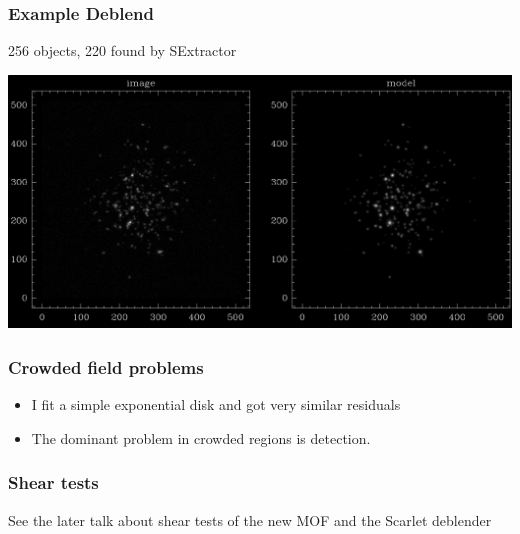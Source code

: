 \documentclass{beamer}
\newcommand{\mcal}{\textsc{metacalibration}}
\begin{document}
\frame
{
    \frametitle{Example Deblend}

        256 objects, 220 found by SExtractor
    \begin{center}
        \includegraphics[width=\columnwidth]{example-side-by-side.png}
    \end{center}
}




\frame
{
    \frametitle{Crowded field problems}

    \begin{itemize}

        \item I fit a simple exponential disk and got very similar residuals

        \item The dominant problem in crowded regions is detection.

    \end{itemize}
}

\frame
{
    \frametitle{Shear tests}

    See the later talk about shear tests of the new MOF and the Scarlet deblender
}



\end{document}
